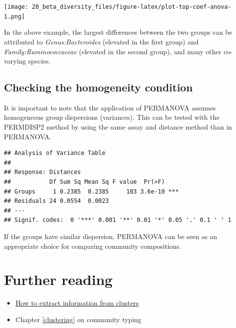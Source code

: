 \documentclass[
]{book}
\newenvironment{Shaded}{\begin{snugshade}}{\end{snugshade}}
\newcommand{\FunctionTok}[1]{\textcolor[rgb]{0.00,0.00,0.00}{#1}}
\newcommand{\NormalTok}[1]{#1}
\newcommand{\SpecialCharTok}[1]{\textcolor[rgb]{0.00,0.00,0.00}{#1}}
\newcommand{\StringTok}[1]{\textcolor[rgb]{0.31,0.60,0.02}{#1}}
\begin{document}
\texttt{[image: 20\_beta\_diversity\_files/figure-latex/plot-top-coef-anova-1.png]}

In the above example, the largest differences between the two groups
can be attributed to \emph{Genus:Bacteroides} (elevated in the first
group) and \emph{Family:Ruminococcaceae} (elevated in the second
group), and many other co-varying species.

\hypertarget{checking-the-homogeneity-condition}{%
\subsection{Checking the homogeneity condition}\label{checking-the-homogeneity-condition}}

It is important to note that the application of PERMANOVA assumes
homogeneous group dispersions (variances). This can be tested with the
PERMDISP2 method \citep{Anderson2006} by using the same assay and distance
method than in PERMANOVA.

\begin{Shaded}
\end{Shaded}

\begin{verbatim}
## Analysis of Variance Table
## 
## Response: Distances
##           Df Sum Sq Mean Sq F value  Pr(>F)    
## Groups     1 0.2385  0.2385     103 3.6e-10 ***
## Residuals 24 0.0554  0.0023                    
## ---
## Signif. codes:  0 '***' 0.001 '**' 0.01 '*' 0.05 '.' 0.1 ' ' 1
\end{verbatim}

If the groups have similar dispersion, PERMANOVA can be seen as an
appropriate choice for comparing community compositions.

\hypertarget{further-reading}{%
\section{Further reading}\label{further-reading}}

\begin{itemize}
\item
  \href{http://bioconductor.org/books/release/OSCA/clustering.html}{How to extract information from clusters}
\item
  Chapter \ref{clustering} on community typing
\end{itemize}
\end{document}
